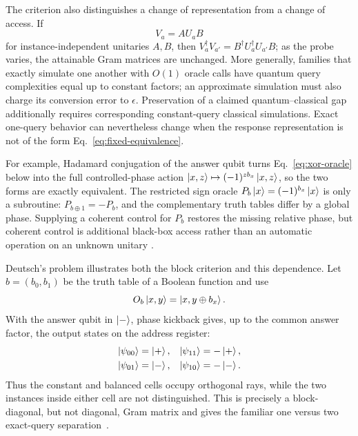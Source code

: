\documentclass[
  aps,
  prl,
  reprint,
  nofootinbib
]{revtex4-2}
\begin{document}
The criterion also distinguishes a change of representation from a change
of access. If
\begin{equation}
 V_a=A U_a B
 \label{eq:fixed-equivalence}
\end{equation}
for instance-independent unitaries \(A,B\), then
\(V_a^\dagger V_{a'}=B^\dagger U_a^\dagger U_{a'}B\); as the probe varies,
the attainable Gram matrices are unchanged. More generally, families that
exactly simulate one another with \(O(1)\) oracle calls have quantum query
complexities equal up to constant factors; an approximate simulation must
also charge its conversion error to \(\epsilon\). Preservation of a claimed
quantum--classical gap additionally requires corresponding constant-query
classical simulations. Exact one-query behavior can nevertheless change
when the response representation is not of the form
Eq.~\eqref{eq:fixed-equivalence}.

For example, Hadamard conjugation of the answer qubit turns
Eq.~\eqref{eq:xor-oracle} below into the full controlled-phase action
\(\ket{x,z}\mapsto(-1)^{z b_x}\ket{x,z}\), so the two forms are exactly
equivalent. The restricted sign oracle
\(P_b\ket x=(-1)^{b_x}\ket x\) is only a subroutine:
\(P_{b\oplus 1}=-P_b\), and the complementary truth tables differ by a
global phase. Supplying a coherent control for \(P_b\) restores the missing
relative phase, but coherent control is additional black-box access rather
than an automatic operation on an unknown unitary
\cite{AraujoFeixCostaBrukner2014}.

Deutsch's problem illustrates both the block criterion and this dependence.
Let \(b=(b_0,b_1)\) be the truth table of a Boolean function and use
\begin{equation}
 O_b\ket{x,y}=\ket{x,y\oplus b_x}.
 \label{eq:xor-oracle}
\end{equation}
With the answer qubit in \(\ket-\), phase kickback gives, up to the common
answer factor, the output states on the address register:
\begin{equation}
 \begin{aligned}
 \ket{\psi_{00}}&= \ket{+},&
 \ket{\psi_{11}}&=-\ket{+},\\
 \ket{\psi_{01}}&= \ket{-},&
 \ket{\psi_{10}}&=-\ket{-}.
 \end{aligned}
 \label{eq:deutsch-rays}
\end{equation}
Thus the constant and balanced cells occupy orthogonal rays, while the two
instances inside either cell are not distinguished. This is precisely a
block-diagonal, but not diagonal, Gram matrix and gives the familiar one
versus two exact-query separation~\cite{deutsch}.
\end{document}
